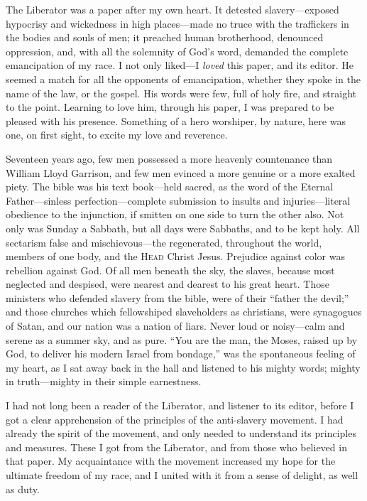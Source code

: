 The Liberator was a paper after my own heart. It detested
slavery---exposed hypocrisy and wickedness in high places---made no
truce with the traffickers in the bodies and souls of men; it preached
human brotherhood, denounced oppression, and, with all the solemnity of
God's word, demanded the complete emancipation of my race. I not only
liked---I \emph{loved} this paper, and its editor. He seemed a match for
all the opponents of emancipation, whether they spoke in the name of the
law, or the gospel. His words were few, full of holy fire, and straight
to the point. Learning to love him, through his paper, I was prepared to
be pleased with his presence. Something of a hero worshiper, by nature,
here was one, on first sight, to excite my love and reverence.

Seventeen years ago, few men possessed a more
{\protect\hypertarget{355}{}{}}heavenly countenance than William Lloyd
Garrison, and few men evinced a more genuine or a more exalted piety.
The bible was his text book---held sacred, as the word of the Eternal
Father---sinless perfection---complete submission to insults and
injuries---literal obedience to the injunction, if smitten on one side
to turn the other also. Not only was Sunday a Sabbath, but all days were
Sabbaths, and to be kept holy. All sectarism false and mischievous---the
regenerated, throughout the world, members of one body, and the
\textsc{Head} Christ Jesus. Prejudice against color was rebellion
against God. Of all men beneath the sky, the slaves, because most
neglected and despised, were nearest and dearest to his great heart.
Those ministers who defended slavery from the bible, were of their
``father the devil;'' and those churches which fellowshiped slaveholders
as christians, were synagogues of Satan, and our nation was a nation of
liars. Never loud or noisy---calm and serene as a summer sky, and as
pure. ``You are the man, the Moses, raised up by God, to deliver his
modern Israel from bondage,'' was the spontaneous feeling of my heart,
as I sat away back in the hall and listened to his mighty words; mighty
in truth---mighty in their simple earnestness.

I had not long been a reader of the Liberator, and listener to its
editor, before I got a clear apprehension of the principles of the
anti-slavery movement. I had already the spirit of the movement, and
only needed to understand its principles and measures. These I got from
the Liberator, and from those who believed in that paper. My
acquaintance with the {\protect\hypertarget{356}{}{}}movement increased
my hope for the ultimate freedom of my race, and I united with it from a
sense of delight, as well as duty.

